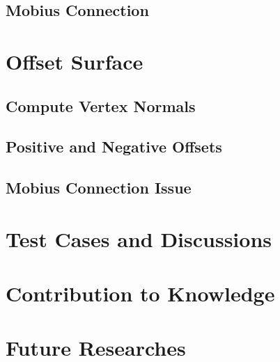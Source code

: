 \documentclass[12pt]{article}
\begin{document}
\subsection{Mobius Connection}

\section{Offset Surface} \label{sec:offset}

\subsection{Compute Vertex Normals}

\subsection{Positive and Negative Offsets}

\subsection{Mobius Connection Issue}


\section{Test Cases and Discussions}



\section{Contribution to Knowledge}





\section{Future Researches}
\end{document}
